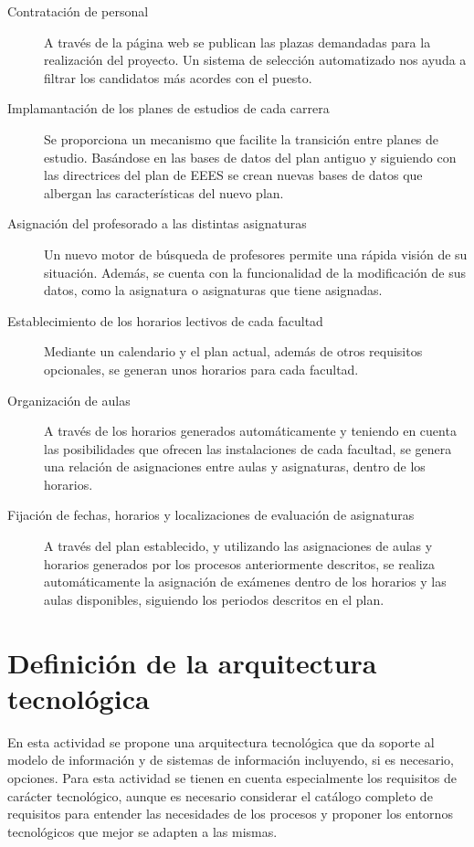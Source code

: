 \documentclass[11pt,a4paper,spanish,twoside]{book}
\begin{document}
\begin{description}
\item[Contratación de personal] A través de la página web se publican las
  plazas demandadas para la realización del proyecto. Un sistema de selección
  automatizado nos ayuda a filtrar los candidatos más acordes con el
  puesto. 
\item[Implamantación de los planes de estudios de cada carrera] Se
  proporciona un mecanismo que facilite la transición entre planes de
  estudio. Basándose en las bases de datos del plan antiguo y siguiendo con
  las directrices del plan de EEES se crean nuevas bases de datos que
  albergan las características del nuevo plan. 
\item[Asignación del profesorado a las distintas asignaturas] Un nuevo motor
  de búsqueda de profesores permite una rápida visión de su
  situación. Además, se cuenta con la funcionalidad de la modificación de
  sus datos, como la asignatura o asignaturas que tiene asignadas. 
\item[Establecimiento de los horarios lectivos de cada facultad] Mediante un
  calendario y el plan actual, además de otros requisitos opcionales, se
  generan unos horarios para cada facultad. 
\item[Organización de aulas] A través de los horarios generados
  automáticamente y teniendo en cuenta las posibilidades que ofrecen las
  instalaciones de cada facultad, se genera una relación de asignaciones
  entre aulas y asignaturas, dentro de los horarios. 
\item[Fijación de fechas, horarios y localizaciones de evaluación de
  asignaturas] A través del plan establecido, y utilizando las asignaciones
  de aulas y horarios generados por los procesos anteriormente descritos, se
  realiza automáticamente la asignación de exámenes dentro de los horarios y
  las aulas disponibles, siguiendo los periodos descritos en el plan. 
\end{description}
 
\chapter{Definición de la arquitectura tecnológica}
En esta actividad se propone una arquitectura tecnológica que da soporte al
modelo de información y de sistemas de información incluyendo, si es
necesario, opciones. Para esta actividad se tienen en cuenta especialmente
los requisitos de carácter tecnológico, aunque es necesario considerar el
catálogo completo de requisitos para entender las necesidades de los procesos
y proponer los entornos tecnológicos que mejor se adapten a las mismas. 
\end{document}
